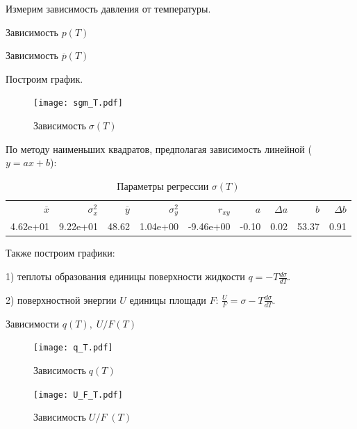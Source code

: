 \documentclass[12pt,a4paper]{article}
\begin{document}
\newpage

		Измерим зависимость давления от температуры.
		
		\begin{table}[h]
			\caption{Зависимость $p(T)$}
				
		\end{table}
		
		\begin{table}[h]
			\caption{Зависимость $\overline{p}(T)$}
			
			
		\end{table}
		
		Построим график.
		
		\begin{figure}[H]
			\texttt{[image: sgm\_T.pdf]}
			\caption{$ \text{Зависимость} \; \sigma(T)$}
		\end{figure}
		
		
		По методу наименьших квадратов, предполагая зависимость линейной ($y = ax + b$):
		
		\begin{table}[h]
			\caption{Параметры регрессии $\sigma (T)$}
			\begin{tabular}{rrrrrrrrr}
				\hline
				$\overline{x}$ & $\sigma_x^2$ & $\overline{y}$ & $\sigma_y^2$ & $r_{xy}$ & $a$ & $\Delta a$ & $b$ & $\Delta b$ \\
				4.62e+01 & 9.22e+01 & 48.62 & 1.04e+00 & -9.46e+00 & -0.10 & 0.02 & 53.37 & 0.91 \\
				\hline
			\end{tabular}
		\end{table}
	
\newpage

		Также построим графики:
		
		1) теплоты образования единицы поверхности жидкости $q = - T \frac{d\sigma}{dT}$.
		
		2) поверхностной энергии $U$ единицы площади $F$: $\frac{U}{F} = \sigma - T \frac{d\sigma}{dT}$.
		
		\begin{table}[h]
			\caption{Зависимости $q(T), \; U/F(T)$}
			
		\end{table}
				
		\begin{figure}[H]
			\texttt{[image: q\_T.pdf]}
			\caption{$ \text{Зависимость} \; q(T)$}
		\end{figure}
		
		\begin{figure}[H]
			\texttt{[image: U\_F\_T.pdf]}
			\caption{$ \text{Зависимость} \; U/F \;(T)$}
		\end{figure}
		
\end{document}
